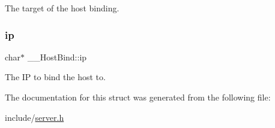 The target of the host binding. 

\mbox{\label{struct_____host_bind_adb22dedfee930d080c8acea30d3393c6}} 
\subsubsection{\texorpdfstring{ip}{ip}}
{\footnotesize\ttfamily char$\ast$ \+\_\+\+\_\+\+Host\+Bind\+::ip}



The IP to bind the host to. 



The documentation for this struct was generated from the following file\+:\begin{DoxyCompactItemize}
\item 
include/\mbox{\hyperlink{server_8h}{server.\+h}}\end{DoxyCompactItemize}
